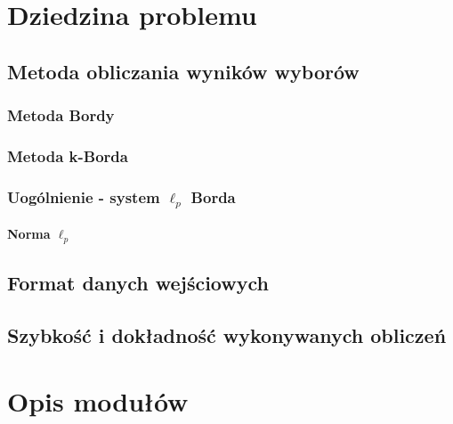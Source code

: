 \documentclass[pdflatex,11pt]{../aghdoc}
\author{Tomasz Kasprzyk, Daniel Ogiela, Jakub Stępak}
\date{2016}
\begin{document}
\titlepages

\tableofcontents


\chapter{Dziedzina problemu}
\label{cha:dziedzina_problemu}

\section{Metoda obliczania wyników wyborów}
\label{sec:metoda_obliczania_wynikow_wyborow}

\subsection{Metoda Bordy}
\label{subsec:metoda_bordy}

\subsection{Metoda k-Borda}
\label{subsec:metoda_k_borda}

\subsection{Uogólnienie - system $\ell_p$ Borda}
\label{subsec:system_ell_p_borda}

\subsubsection{Norma $\ell_p$}
\label{subsubsection:norma_ell_p}

\section{Format danych wejściowych}
\label{sec:format_danych_wejsciowych}

\section{Szybkość i dokładność wykonywanych obliczeń}
\label{sec:szybkosc_i_dokladnosc_wykonywanych_obliczen}

\chapter{Opis modułów}
\label{cha:opis_modulow}




\end{document}
